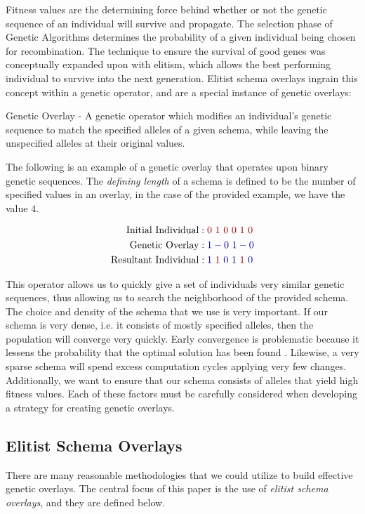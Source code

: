 Fitness values are the determining force behind whether or not the genetic sequence of an individual will survive and propagate. The selection phase of Genetic Algorithms determines the probability of a given individual being chosen for recombination. The technique to ensure the survival of good genes was conceptually expanded upon with elitism, which allows the best performing individual to survive into the next generation. Elitist schema overlays ingrain this concept within a genetic operator, and are a special instance of genetic overlays:

\begin{overlay}
Genetic Overlay - A genetic operator which modifies an individual's genetic sequence to match the specified alleles of a given schema, while leaving the unspecified alleles at their original values. 
\end{overlay}

The following is an example of a genetic overlay that operates upon binary genetic sequences. The \emph{defining length} of a schema is defined to be the number of specified values in an overlay, in the case of the provided example, we have the value $4$.

\begin{align*}
\text{Initial Individual} &: {\color{myred}0~1~0~0~1~0} 		\\
\text{Genetic Overlay} &: {\color{myblue}1-0~1-0}				\\
\text{Resultant Individual} &: {\color{myblue}1}~{\color{myred}1}~{\color{myblue}0~1}~{\color{myred}1}~{\color{myblue}0}	
\end{align*}

This operator allows us to quickly give a set of individuals very similar genetic sequences, thus allowing us to search the neighborhood of the provided schema. The choice and density of the schema that we use is very important. If our schema is very dense, i.e. it consists of mostly specified alleles, then the population will converge very quickly. Early convergence is problematic because it lessens the probability that the optimal solution has been found \cite{Deb99}. Likewise, a very sparse schema will spend excess computation cycles applying very few changes. Additionally, we want to ensure that our schema consists of alleles that yield high fitness values. Each of these factors must be carefully considered when developing a strategy for creating genetic overlays. 

\subsection*{Elitist Schema Overlays}
There are many reasonable methodologies that we could utilize to build effective genetic overlays. The central focus of this paper is the use of \emph{elitist schema overlays}, and they are defined below.

